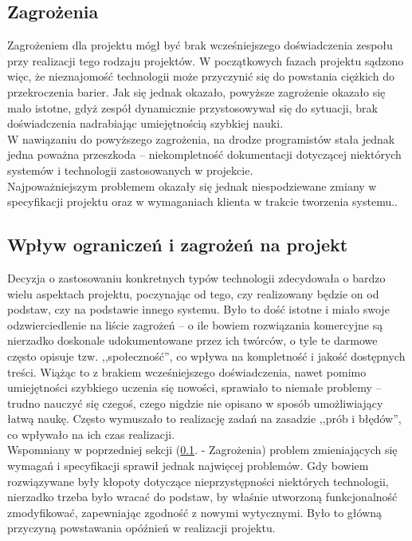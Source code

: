 \subsection{Zagrożenia}
\label{Chapter122}

Zagrożeniem dla projektu mógł być brak wcześniejszego doświadczenia zespołu przy realizacji tego rodzaju projektów. W początkowych fazach projektu sądzono więc, że nieznajomość technologii może przyczynić się do powstania ciężkich do przekroczenia barier. Jak się jednak okazało, powyższe zagrożenie okazało się mało istotne, gdyż zespół dynamicznie przystosowywał się do sytuacji, brak doświadczenia nadrabiając umiejętnością szybkiej nauki. \\

W nawiązaniu do powyższego zagrożenia, na drodze programistów stała jednak jedna poważna przeszkoda -- niekompletność dokumentacji dotyczącej niektórych systemów i technologii zastosowanych w projekcie. \\

Najpoważniejszym problemem okazały się jednak niespodziewane zmiany w specyfikacji projektu oraz w wymaganiach klienta w trakcie tworzenia systemu..

\subsection{Wpływ ograniczeń i zagrożeń na projekt}
\label{Chapter123}

Decyzja o zastosowaniu konkretnych typów technologii zdecydowała o bardzo wielu aspektach projektu, poczynając od tego, czy realizowany będzie on od podstaw, czy na podstawie innego systemu. Było to dość istotne i miało swoje odzwierciedlenie na liście zagrożeń -- o ile bowiem rozwiązania komercyjne są nierzadko doskonale udokumentowane przez ich twórców, o tyle te darmowe często opisuje tzw. ,,społeczność'', co wpływa na kompletność i jakość dostępnych treści. Wiążąc to z brakiem wcześniejszego doświadczenia, nawet pomimo umiejętności szybkiego uczenia się nowości, sprawiało to niemałe problemy -- trudno nauczyć się czegoś, czego nigdzie nie opisano w sposób umożliwiający łatwą naukę. Często wymuszało to realizację zadań na zasadzie ,,prób i błędów'', co wpływało na ich czas realizacji. \\

Wspomniany w poprzedniej sekcji (\ref{Chapter122}. - Zagrożenia) problem zmieniających się wymagań i specyfikacji sprawił jednak najwięcej problemów. Gdy bowiem rozwiązywane były kłopoty dotyczące nieprzystępności niektórych technologii, nierzadko trzeba było wracać do podstaw, by właśnie utworzoną funkcjonalność zmodyfikować, zapewniając zgodność z nowymi wytycznymi. Było to główną przyczyną powstawania opóźnień w realizacji projektu.

